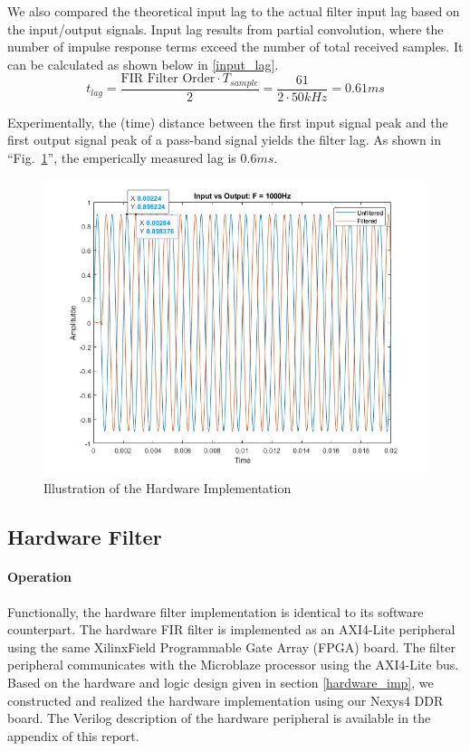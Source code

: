 \documentclass[conference]{IEEEtran}
\begin{document}
We also compared the theoretical input lag to the actual filter input lag based on the input/output signals. Input lag results from partial convolution, where the number of impulse response terms exceed the number of total received samples. It can be calculated as shown below in \eqref{input_lag}.
\begin{equation}
    t_{lag} = \frac{\text{FIR Filter Order} \cdot T_{sample}}{2} = \frac{61}{2 \cdot 50kHz} = 0.61ms
    \label{input_lag}
\end{equation}

Experimentally, the (time) distance between the first input signal peak and the first output signal peak of a pass-band signal yields the filter lag. As shown in ``Fig.~\ref{lag}'', the emperically measured lag is $0.6 ms$.

\begin{figure}[htbp]
    \centerline{\includegraphics[width=\linewidth]{Figures/Filter/delay_graph.jpg}}
    \caption{Illustration of the Hardware Implementation}
    \label{lag}
\end{figure}

\subsection{Hardware Filter} \label{hardware_test}

\paragraph{Operation}
Functionally, the hardware filter implementation is identical to its software counterpart. The hardware FIR filter is implemented as an AXI4-Lite peripheral using the same Xilinx\textregistered \;Field Programmable Gate Array (FPGA) board. The filter peripheral communicates with the Microblaze\textregistered{} processor using the AXI4-Lite bus. Based on the hardware and logic design given in section \ref{hardware_imp}, we constructed and realized the hardware implementation using our Nexys\texttrademark{}4 DDR board. The Verilog description of the hardware peripheral is available in the appendix of this report.
\end{document}
